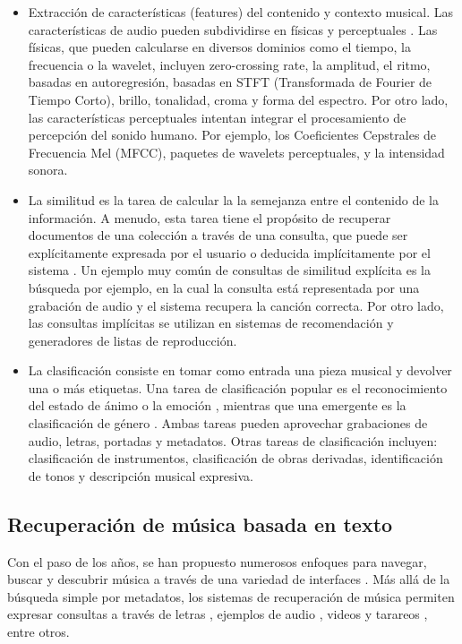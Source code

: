 \begin{itemize}
    \item Extracción de características (features) del contenido y contexto musical. Las características de audio pueden subdividirse en físicas y perceptuales \cite{Alas2016ARO}. Las físicas, que pueden calcularse en diversos dominios como el tiempo, la frecuencia o la wavelet, incluyen zero-crossing rate, la amplitud, el ritmo, basadas en autoregresión, basadas en STFT (Transformada de Fourier de Tiempo Corto), brillo, tonalidad, croma y forma del espectro. Por otro lado, las características perceptuales intentan integrar el procesamiento de percepción del sonido humano. Por ejemplo, los Coeficientes Cepstrales de Frecuencia Mel (MFCC), paquetes de wavelets perceptuales, y la intensidad sonora.\\
    \item La similitud es la tarea de calcular la la semejanza entre el contenido de la información. A menudo, esta tarea tiene el propósito de recuperar documentos de una colección a través de una consulta, que puede ser explícitamente expresada por el usuario o deducida implícitamente por el sistema \cite{Simonetta2019MultimodalMI}. Un ejemplo muy común de consultas de similitud explícita es la búsqueda por ejemplo, en la cual la consulta está representada por una grabación de audio y el sistema recupera la canción correcta. Por otro lado, las consultas implícitas se utilizan en sistemas de recomendación y generadores de listas de reproducción.
    \item La clasificación consiste en tomar como entrada una pieza musical y devolver una o más etiquetas. Una tarea de clasificación popular es el reconocimiento del estado de ánimo o la emoción \cite{Kim2010StateOT}, mientras que una emergente es la clasificación de género \cite{Allamy20211DCA, AthulyaK2021DeepLB, Qiu2021DBTMPEDB, Rafi2021ComparativeAO, Koparde2021ASO, Ndou2021MusicGC, Prince2022MusicGC}. Ambas tareas pueden aprovechar grabaciones de audio, letras, portadas y metadatos. Otras tareas de clasificación incluyen: clasificación de instrumentos, clasificación de obras derivadas, identificación de tonos y descripción musical expresiva.
\end{itemize}
\subsection{Recuperación de música basada en texto}
\label{subsec:text-based retrieval}
Con el paso de los años, se han propuesto numerosos enfoques para navegar, buscar y descubrir música a través de una variedad de interfaces \cite{Manco2022ContrastiveAL}. Más allá de la búsqueda simple por metadatos, los sistemas de recuperación de música permiten expresar consultas a través de letras \cite{Tsukuda2017LyricJA}, ejemplos de audio \cite{Lee2020DisentangledMM}, videos \cite{Li2019QueryBV} y tarareos \cite{Patel2021MusicRS}, entre otros.

